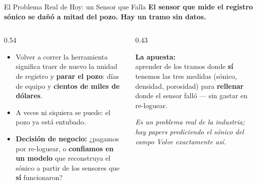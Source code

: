 \documentclass[aspectratio=169, 11pt]{beamer}
\begin{document}
\begin{frame}{El Problema Real de Hoy: un Sensor que Falla}
  \vspace{-6pt}
  {\small\color{arcaDark}\bfseries
    El sensor que mide el registro sónico se dañó a mitad del pozo. Hay un tramo \textbf{sin datos}.}

  \vspace{6pt}
  \begin{columns}[T]
    \begin{column}{0.54\textwidth}
      {\footnotesize\color{textMuted}
      \begin{itemize}\setlength{\itemsep}{7pt}
        \item[{\color{arcaRed}\scriptsize\faDollarSign}]
          Volver a correr la herramienta significa traer de nuevo la
          unidad de registro y \textbf{parar el pozo}: días de equipo y
          \textbf{cientos de miles de dólares}.
        \item[{\color{arcaRed}\scriptsize\faExclamationTriangle}]
          A veces ni siquiera se puede: el pozo ya está entubado.
        \item[{\color{codeGreen}\scriptsize\faLightbulb}]
          \textbf{Decisión de negocio:} ¿pagamos por re-loguear, o
          \textbf{confiamos en un modelo} que reconstruya el sónico a
          partir de los sensores que \textbf{sí} funcionaron?
      \end{itemize}
      }
    \end{column}
    \begin{column}{0.43\textwidth}
      \begin{tcolorbox}[colback=arcaGray, colframe=arcaRed, boxrule=0pt,
        leftrule=3pt, arc=3pt, left=6pt, right=6pt, top=5pt, bottom=5pt]
        {\scriptsize\color{arcaDark}\bfseries La apuesta:}\\[4pt]
        {\scriptsize\color{textMuted}
        aprender de los tramos donde \textbf{sí} tenemos las tres medidas
        (sónico, densidad, porosidad) para \textbf{rellenar} donde el
        sensor falló --- sin gastar en re-loguear.}
      \end{tcolorbox}
      \vspace{5pt}
      {\scriptsize\color{textMuted}\itshape
        Es un problema real de la industria; hay papers prediciendo el
        sónico del campo Volve exactamente así.}
    \end{column}
  \end{columns}
\end{frame}
\end{document}
